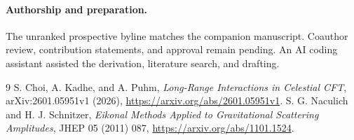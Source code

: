 \documentclass[11pt]{article}
\begin{document}
\paragraph{Authorship and preparation.}
The unranked prospective byline matches the companion manuscript.
Coauthor review, contribution statements, and approval remain pending.
An AI coding assistant assisted the derivation, literature search,
and drafting.

\begin{thebibliography}{9}
S. Choi, A. Kadhe, and A. Puhm, \emph{Long-Range Interactions in Celestial CFT},
arXiv:2601.05951v1 (2026), \url{https://arxiv.org/abs/2601.05951v1}.
S. G. Naculich and H. J. Schnitzer,
\emph{Eikonal Methods Applied to Gravitational Scattering Amplitudes},
JHEP 05 (2011) 087, \url{https://arxiv.org/abs/1101.1524}.
\end{thebibliography}
\end{document}
